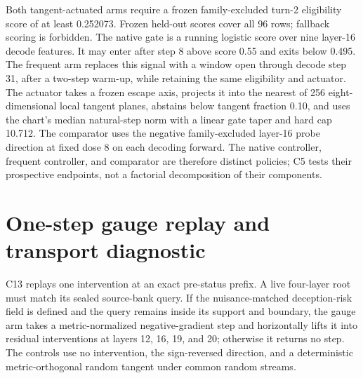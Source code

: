 \begin{table}[h]
\caption{C5 paired machine-status transitions by evaluation family. Each cell is
fixes/harms among 12 rows in the named source stratum; its net correctness change is
$(\mathrm{fixes}-\mathrm{harms})/12$. D and H denote deceptive-source and honest-source rows, not
baseline correctness.}
\label{tab:c5-family}
\centering
\scriptsize
{}
\end{table}

Both tangent-actuated arms require a frozen family-excluded turn-2 eligibility score of at least
0.252073. Frozen held-out scores cover all 96 rows; fallback scoring is forbidden. The native gate
is a running logistic score over nine layer-16 decode features. It may
enter after step 8 above score 0.55 and exits below 0.495. The frequent arm replaces this signal with
a window open through decode step 31, after a two-step warm-up, while retaining the same
eligibility and actuator. The actuator takes a frozen escape axis, projects it into the nearest
of 256 eight-dimensional local tangent planes, abstains below tangent fraction 0.10, and uses the
chart's median natural-step norm with a linear gate taper and hard cap 10.712. The comparator uses
the negative family-excluded layer-16 probe direction at fixed dose 8 on each decoding forward.
The native controller, frequent controller, and comparator are therefore distinct policies; C5
tests their prospective endpoints, not a factorial decomposition of their components.

\section{One-step gauge replay and transport diagnostic}
\label{app:c13}

C13 replays one intervention at an exact pre-status prefix. A live four-layer root must match its
sealed source-bank query. If the nuisance-matched deception-risk field is defined and the query
remains inside its support and boundary, the gauge arm takes a metric-normalized negative-gradient
step and horizontally lifts it into residual interventions at layers 12, 16, 19, and 20;
otherwise it returns no step. The controls use no intervention, the sign-reversed direction, and
a deterministic metric-orthogonal random tangent under common random streams.


